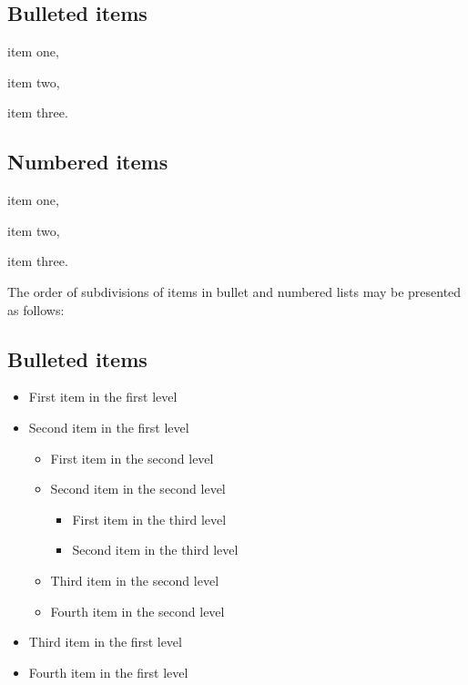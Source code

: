 \documentclass{ws-ijtaf}
\begin{document}
\subsection*{Bulleted items}

\begin{itemlist}
 \item item one,
 \item item two,
 \item item three.
\end{itemlist}

\subsection*{Numbered items}

\begin{arabiclist}
 \item item one,
 \item item two,
 \item item three.
\end{arabiclist}

The order of subdivisions of items in bullet and numbered lists
may be presented as follows:

\subsection*{Bulleted items}

\begin{itemize}
\item First item in the first level
\item Second item in the first level
\begin{itemize}
\item First item in the second level
\item Second item in the second level
\begin{itemize}
\item First item in the third level
\item Second item in the third level
\end{itemize}
\item Third item in the second level
\item Fourth item in the second level
\end{itemize}
\item Third item in the first level
\item Fourth item in the first level
\end{itemize}
\end{document}
